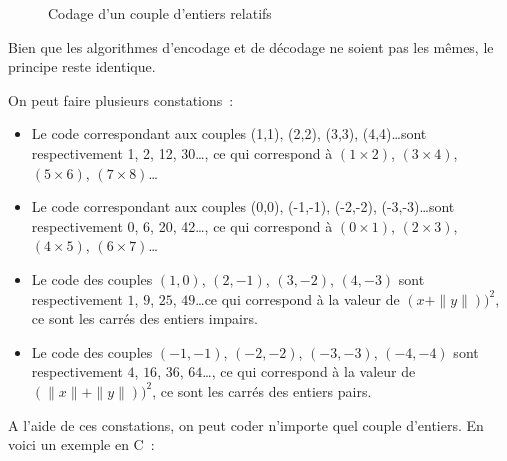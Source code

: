 \documentclass{article}
\begin{document}
\begin{figure}[ht!]
  \caption{Codage d'un couple d'entiers relatifs}
  \label{fig:codage-rel}
\end{figure}

Bien que les algorithmes d'encodage et de décodage ne soient pas les mêmes, le principe reste identique. 

On peut faire plusieurs constations~:

\begin{itemize}
\item Le code correspondant aux couples (1,1), (2,2), (3,3), (4,4)\ldots sont respectivement 1, 2, 12, 30\ldots, ce qui correspond à $(1 \times 2)$, $(3 \times 4)$, $(5 \times 6)$, $(7 \times 8)$\ldots
\item Le code correspondant aux couples (0,0), (-1,-1), (-2,-2), (-3,-3)\ldots sont respectivement 0, 6, 20, 42\ldots, ce qui correspond à $(0 \times 1)$, $(2 \times 3)$, $(4 \times 5)$, $(6 \times 7)$\ldots
\item Le code des couples $(1,0)$, $(2,-1)$, $(3,-2)$, $(4,-3)$ sont respectivement $1$, $9$, $25$, $49$\ldots ce qui correspond à la valeur de $(x + \|y\|))^{2}$, ce sont les carrés des entiers impairs.
\item Le code des couples $(-1,-1)$, $(-2,-2)$, $(-3,-3)$, $(-4,-4)$ sont respectivement $4$, $16$, $36$, $64$\ldots,  ce qui correspond à la valeur de $(\|x\| + \|y\|))^{2}$, ce sont les carrés des entiers pairs.
\end{itemize}


A l'aide de ces constations, on peut coder n'importe quel couple d'entiers. En voici un exemple en C~:
\end{document}
